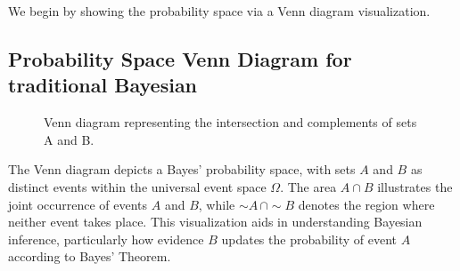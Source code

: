 \documentclass[
  12 pt,
  a4paper,
]{book}
\numberwithin{equation}{section}
\theoremstyle{plain}      %
\theoremstyle{definition} %
\theoremstyle{remark}     %
\theoremstyle{note}         %
\begin{document}
We begin by showing the probability space via a Venn diagram
visualization.

\hypertarget{probability-space-venn-diagram-for-traditional-bayesian}{%
\subsection{Probability Space Venn Diagram for traditional
Bayesian}\label{probability-space-venn-diagram-for-traditional-bayesian}}

\begin{figure}[htbp]
\centering
{}
\caption{Venn diagram representing the intersection and complements of sets A and B.}
\label{fig:venn-diagram}
\end{figure}

The Venn diagram depicts a Bayes' probability space, with sets \(A\) and
\(B\) as distinct events within the universal event space \(\Omega\).
The area \(A \cap B\) illustrates the joint occurrence of events \(A\)
and \(B\), while \(\sim\! A \, \cap \sim\! B\) denotes the region where
neither event takes place. This visualization aids in understanding
Bayesian inference, particularly how evidence \(B\) updates the
probability of event \(A\) according to Bayes' Theorem.
\end{document}
